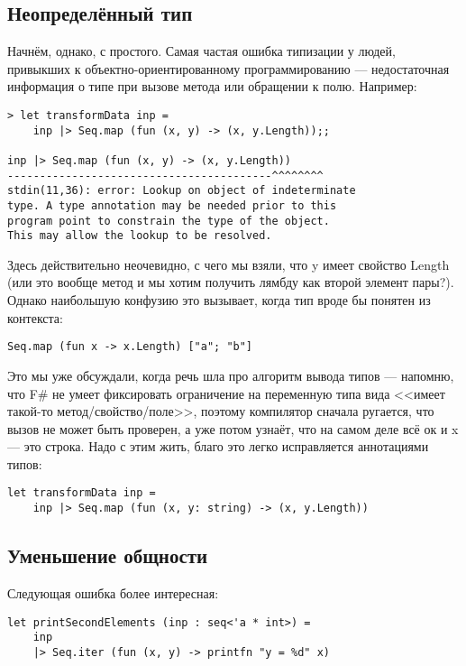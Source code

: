 \documentclass[a5paper]{article}
\begin{document}
\subsection{Неопределённый тип}

Начнём, однако, с простого. Самая частая ошибка типизации у людей, привыкших к объектно-ориентированному программированию --- недостаточная информация о типе при вызове метода или обращении к полю. Например:

\begin{verbatim}
> let transformData inp =
    inp |> Seq.map (fun (x, y) -> (x, y.Length));;

inp |> Seq.map (fun (x, y) -> (x, y.Length))
-----------------------------------------^^^^^^^^
stdin(11,36): error: Lookup on object of indeterminate 
type. A type annotation may be needed prior to this 
program point to constrain the type of the object. 
This may allow the lookup to be resolved.
\end{verbatim}

Здесь действительно неочевидно, с чего мы взяли, что y имеет свойство Length (или это вообще метод и мы хотим получить лямбду как второй элемент пары?). Однако наибольшую конфузию это вызывает, когда тип вроде бы понятен из контекста:

\begin{verbatim}
Seq.map (fun x -> x.Length) ["a"; "b"]
\end{verbatim}

Это мы уже обсуждали, когда речь шла про алгоритм вывода типов --- напомню, что F\# не умеет фиксировать ограничение на переменную типа вида <<имеет такой-то метод/свойство/поле>>, поэтому компилятор сначала ругается, что вызов не может быть проверен, а уже потом узнаёт, что на самом деле всё ок и x --- это строка. Надо с этим жить, благо это легко исправляется аннотациями типов:

\begin{verbatim}
let transformData inp =
    inp |> Seq.map (fun (x, y: string) -> (x, y.Length))
\end{verbatim}

\subsection{Уменьшение общности}

Следующая ошибка более интересная:

\begin{verbatim}
let printSecondElements (inp : seq<'a * int>) =
    inp
    |> Seq.iter (fun (x, y) -> printfn "y = %d" x)
\end{verbatim}
\end{document}
